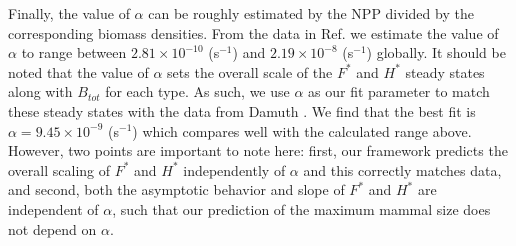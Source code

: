\documentclass[twocolumn,preprintnumbers,amsmath,amssymb,superscriptaddress]{revtex4}
\begin{document}
Finally, the value of $\alpha$ can be roughly estimated by the NPP divided by the corresponding biomass densities. From the data in Ref. \citep{michaletz2014convergence} we estimate the value of $\alpha$ to range between $2.81\times10^{-10}$ (s$^{-1}$) and $2.19\times10^{-8}$ (s$^{-1}$) globally. It should be noted that the value of $\alpha$ sets the overall scale of the $F^{*}$ and $H^{*}$ steady states along with $B_{tot}$ for each type. As such, we use $\alpha$ as our fit parameter to match these steady states with the data from Damuth \citep{damuth1987interspecific}. We find that the best fit is $\alpha=9.45\times10^{-9}$ (s$^{-1}$) which compares well with the calculated range above. However, two points are important to note here: first, our framework predicts the overall scaling of $F^{*}$ and $H^{*}$ independently of $\alpha$ and this correctly matches data, and second, both the asymptotic behavior and slope of $F^{*}$ and $H^{*}$ are independent of $\alpha$, such that our prediction of the maximum mammal size does not depend on $\alpha$.
\\


\end{document}
